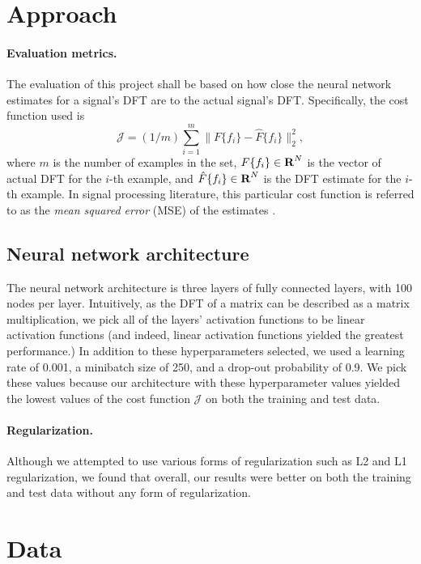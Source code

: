 \documentclass[12pt]{article}
\begin{document}
\section{Approach} \label{s-approach}

\paragraph{Evaluation metrics.}
The evaluation of this project shall be based on how close the neural network estimates for 
a signal's DFT are to the actual signal's DFT. Specifically, the cost function used is
\[
\mathcal J = (1/m) \sum_{i = 1}^{m} \|F\{f_i\} - \hat{F}\{f_i\} \|_2^2,
\]
where $m$ is the number of examples in the set, $F\{f_i\} \in {\mbox{\bf R}}^N$ is the vector of actual DFT 
for the $i$-th example, and $\hat{F}\{f_i\} \in {\mbox{\bf R}}^N$ is the DFT estimate for the $i$-th example. 
In signal processing literature, this particular cost function is referred to as the 
\emph{mean squared error} (MSE) of the estimates \cite{DG:10}.

\subsection{Neural network architecture} The neural network architecture is three layers of 
fully connected layers, with 100 nodes per layer. Intuitively, as the DFT of a matrix can be described 
as a matrix multiplication, we pick all of the layers' activation functions to be linear activation 
functions (and indeed, linear activation functions yielded the greatest performance.) In addition to these 
hyperparameters selected, we used a learning rate of 0.001, a minibatch size of 250, and a drop-out 
probability of 0.9. We pick these values because our architecture with these hyperparameter values yielded 
the lowest values of the cost function $\mathcal J$ on both the training and test data.

\paragraph{Regularization.} Although we attempted to use various forms of regularization such as L2 and 
L1 regularization, we found that overall, our results were better on both the training and test data 
without any form of regularization.

\section{Data}
\end{document}
